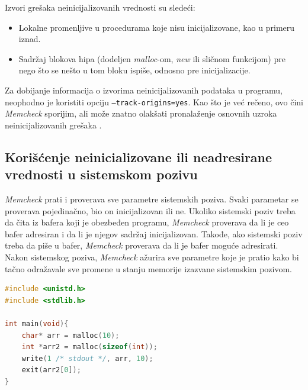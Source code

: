 \documentclass[12pt,oneside]{memoir}
\theoremstyle{plain}
\theoremstyle{definition}
\begin{document}
Izvori grešaka neinicijalizovanih vrednosti su sledeći:
\begin{itemize}
\item Lokalne promenljive u procedurama koje nisu inicijalizovane, kao u primeru iznad.
\item Sadržaj blokova hipa (dodeljen \textit{malloc}-om, \textit{new} ili sličnom funkcijom) pre nego što se nešto u tom bloku ispiše, odnosno pre inicijalizacije.
\end{itemize}

Za dobijanje informacija o izvorima neinicijalizovanih podataka u programu, neophodno je koristiti opciju \texttt{--track-origins=yes}. Kao što je već rečeno, ovo čini \textit{Memcheck} sporijim, ali može znatno olakšati pronalaženje osnovnih uzroka neinicijalizovanih grešaka \cite{Memcheck}. 

\subsection{Korišćenje neinicializovane ili neadresirane vrednosti u sistemskom pozivu}

\textit{Memcheck} prati i proverava sve parametre sistemskih poziva. Svaki parametar se proverava pojedinačno, bio on inicijalizovan ili ne. Ukoliko sistemski poziv treba da čita iz bafera  koji je obezbeđen programu, \textit{Memcheck} proverava da li je ceo bafer adresiran i da li je njegov sadržaj inicijalizovan. Takođe, ako sistemski poziv treba da piše u bafer, \textit{Memcheck} proverava da li je bafer moguće adresirati. Nakon sistemskog poziva, \textit{Memcheck} ažurira sve parametre koje je pratio kako bi tačno odražavale sve promene u stanju memorije izazvane sistemskim pozivom.

\begin{lstlisting}[style=mystyle,caption={Program koji izaziva grešku korišćenja neinicializovane ili neadresirane vrednosti u sistemskom pozivu, izvor: \cite{Memcheck}}, label={lst:slika2.6},language={C}] 
#include <unistd.h>
#include <stdlib.h>

int main(void){
	char* arr = malloc(10);
	int *arr2 = malloc(sizeof(int));
	write(1 /* stdout */, arr, 10);
	exit(arr2[0]);
}
\end{lstlisting}

\end{document}
